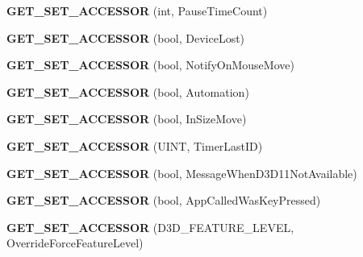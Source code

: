 \begin{DoxyCompactItemize}
\item 
\hypertarget{class_d_x_u_t_state_a13cadfb38e001bbb14292eb6aae1a03c}{{\bfseries G\+E\+T\+\_\+\+S\+E\+T\+\_\+\+A\+C\+C\+E\+S\+S\+O\+R} (int, Pause\+Time\+Count)}\label{class_d_x_u_t_state_a13cadfb38e001bbb14292eb6aae1a03c}

\item 
\hypertarget{class_d_x_u_t_state_a8157a0e71d8bf110321f863669395df0}{{\bfseries G\+E\+T\+\_\+\+S\+E\+T\+\_\+\+A\+C\+C\+E\+S\+S\+O\+R} (bool, Device\+Lost)}\label{class_d_x_u_t_state_a8157a0e71d8bf110321f863669395df0}

\item 
\hypertarget{class_d_x_u_t_state_a630e216973e43a6ca8a58fb920ff57e5}{{\bfseries G\+E\+T\+\_\+\+S\+E\+T\+\_\+\+A\+C\+C\+E\+S\+S\+O\+R} (bool, Notify\+On\+Mouse\+Move)}\label{class_d_x_u_t_state_a630e216973e43a6ca8a58fb920ff57e5}

\item 
\hypertarget{class_d_x_u_t_state_a723ae3207d893c922cd9c6d2ff029f60}{{\bfseries G\+E\+T\+\_\+\+S\+E\+T\+\_\+\+A\+C\+C\+E\+S\+S\+O\+R} (bool, Automation)}\label{class_d_x_u_t_state_a723ae3207d893c922cd9c6d2ff029f60}

\item 
\hypertarget{class_d_x_u_t_state_a4f607198bc37270086456d147197c6a1}{{\bfseries G\+E\+T\+\_\+\+S\+E\+T\+\_\+\+A\+C\+C\+E\+S\+S\+O\+R} (bool, In\+Size\+Move)}\label{class_d_x_u_t_state_a4f607198bc37270086456d147197c6a1}

\item 
\hypertarget{class_d_x_u_t_state_a6922427e890b6e63324c96a19df3858e}{{\bfseries G\+E\+T\+\_\+\+S\+E\+T\+\_\+\+A\+C\+C\+E\+S\+S\+O\+R} (U\+I\+N\+T, Timer\+Last\+I\+D)}\label{class_d_x_u_t_state_a6922427e890b6e63324c96a19df3858e}

\item 
\hypertarget{class_d_x_u_t_state_a79cd28747bde00416a1c6a4f0db8ebcb}{{\bfseries G\+E\+T\+\_\+\+S\+E\+T\+\_\+\+A\+C\+C\+E\+S\+S\+O\+R} (bool, Message\+When\+D3\+D11\+Not\+Available)}\label{class_d_x_u_t_state_a79cd28747bde00416a1c6a4f0db8ebcb}

\item 
\hypertarget{class_d_x_u_t_state_ae73898a7c20df562194b7d74541c2aff}{{\bfseries G\+E\+T\+\_\+\+S\+E\+T\+\_\+\+A\+C\+C\+E\+S\+S\+O\+R} (bool, App\+Called\+Was\+Key\+Pressed)}\label{class_d_x_u_t_state_ae73898a7c20df562194b7d74541c2aff}

\item 
\hypertarget{class_d_x_u_t_state_a6a50eff6d3826302e484c3d66914be43}{{\bfseries G\+E\+T\+\_\+\+S\+E\+T\+\_\+\+A\+C\+C\+E\+S\+S\+O\+R} (D3\+D\+\_\+\+F\+E\+A\+T\+U\+R\+E\+\_\+\+L\+E\+V\+E\+L, Override\+Force\+Feature\+Level)}\label{class_d_x_u_t_state_a6a50eff6d3826302e484c3d66914be43}


\end{DoxyCompactItemize}
